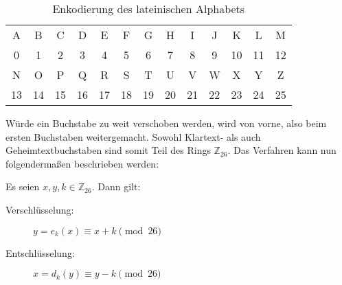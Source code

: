 \begin{table}[h]
  \centering
  \caption{Enkodierung des lateinischen Alphabets}
  \begin{tabular}{|c|c|c|c|c|c|c|c|c|c|c|c|c|}
    \hline
    A  & B  & C  & D  & E  & F  & G  & H  & I  & J  & K  & L  & M  \\
    0  & 1  & 2  & 3  & 4  & 5  & 6  & 7  & 8  & 9  & 10 & 11 & 12 \\
    \hline
    N  & O  & P  & Q  & R  & S  & T  & U  & V  & W  & X  & Y  & Z  \\
    13 & 14 & 15 & 16 & 17 & 18 & 19 & 20 & 21 & 22 & 23 & 24 & 25 \\
    \hline
  \end{tabular}
  \label{tab:encode-alph}
\end{table}

\noindent
Würde ein Buchstabe zu weit verschoben werden, wird von vorne,
also beim ersten Buchstaben weitergemacht.
Sowohl Klartext- als auch Geheimtextbuchstaben sind somit Teil des Rings $\mathbb{Z}_{26}$.
Das Verfahren kann nun folgendermaßen beschrieben werden:

\begin{definition}
  Es seien $x,y,k \in \mathbb{Z}_{26}$. Dann gilt:
  \begin{description}
    \item[Verschlüsselung:] $y = e_k(x) \equiv x + k \pmod{26}$
    \item[Entschlüsselung:] $x = d_k(y) \equiv y - k \pmod{26}$
  \end{description}
\end{definition}

